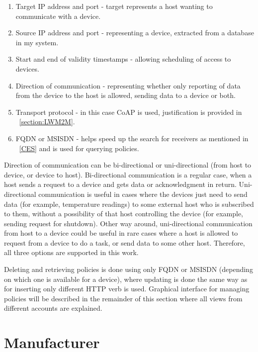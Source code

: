 \begin{enumerate}
	\setlength{\itemsep}{1pt}
	\item Target IP address and port - target represents a host wanting to communicate with a device.
	\item Source IP address and port - representing a device, extracted from a database in my system.
	\item Start and end of validity timestamps - allowing scheduling of access to devices.
	\item Direction of communication - representing whether only reporting of data from the device to the host is allowed, sending data to a device or both.
	\item Transport protocol - in this case CoAP is used, justification is provided in ~\ref{section:LWM2M}.
	\item FQDN or MSISDN - helps speed up the search for receivers as mentioned in ~\ref{CES} and is used for querying policies.
\end{enumerate}

Direction of communication can be bi-directional or uni-directional (from host to device, or device to host). Bi-directional communication is a regular case, when a host sends a request to a device and gets data or acknowledgment in return. Uni-directional communication is useful in cases where the devices just need to send data (for example, temperature readings) to some external host who is subscribed to them, without a possibility of that host controlling the device (for example, sending request for shutdown). Other way around, uni-directional communication from host to a device could be useful in rare cases where a host is allowed to request from a device to do a task, or send data to some other host. Therefore, all three options are supported in this work.

Deleting and retrieving policies is done using only FQDN or MSISDN (depending on which one is available for a device), where updating is done the same way as for inserting only different HTTP verb is used. Graphical interface for managing policies will be described in the remainder of this section where all views from different accounts are explained.

\section{Manufacturer}
\label{Manufacturer}

